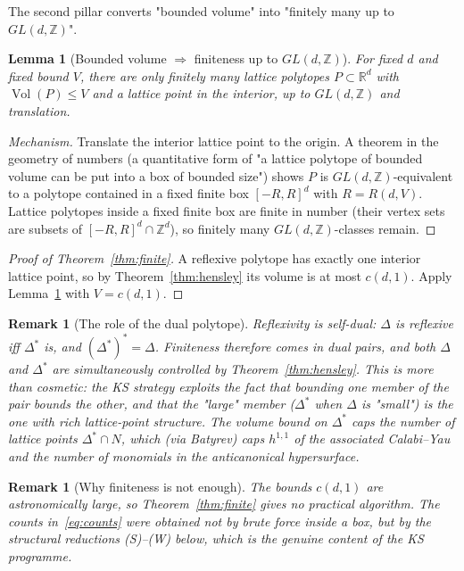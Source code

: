 \documentclass{amsart}
\newtheorem{lemma}[theorem]{Lemma}
\newtheorem{remark}[theorem]{Remark}
\begin{document}
The second pillar converts "bounded volume" into "finitely many up to
$GL(d,\mathbb{Z})$".

\begin{lemma}[Bounded volume $\Rightarrow$ finiteness up to $GL(d,\mathbb{Z})$]
\label{lem:boundedfinite}
For fixed $d$ and fixed bound $V$, there are only finitely many lattice
polytopes $P \subset \mathbb{R}^d$ with $\operatorname{Vol}(P) \leq V$ and a
lattice point in the interior, up to $GL(d,\mathbb{Z})$ and translation.
\end{lemma}

\begin{proof}[Mechanism]
Translate the interior lattice point to the origin. A theorem in the
geometry of numbers (a quantitative form of "a lattice polytope of bounded
volume can be put into a box of bounded size") shows $P$ is
$GL(d,\mathbb{Z})$-equivalent to a polytope contained in a fixed finite box
$[-R,R]^d$ with $R=R(d,V)$. Lattice polytopes inside a fixed finite box are
finite in number (their vertex sets are subsets of $[-R,R]^d \cap
\mathbb{Z}^d$), so finitely many $GL(d,\mathbb{Z})$-classes remain.
\end{proof}

\begin{proof}[Proof of Theorem~\ref{thm:finite}]
A reflexive polytope has exactly one interior lattice point, so by
Theorem~\ref{thm:hensley} its volume is at most $c(d,1)$. Apply
Lemma~\ref{lem:boundedfinite} with $V=c(d,1)$.
\end{proof}

\begin{remark}[The role of the dual polytope]
Reflexivity is self-dual: $\Delta$ is reflexive iff $\Delta^*$ is, and
$(\Delta^*)^* = \Delta$. Finiteness therefore comes in dual pairs, and
\emph{both} $\Delta$ and $\Delta^*$ are simultaneously controlled by
Theorem~\ref{thm:hensley}. This is more than cosmetic: the KS strategy
exploits the fact that bounding one member of the pair bounds the other,
and that the "large" member ($\Delta^*$ when $\Delta$ is "small") is the one
with rich lattice-point structure. The volume bound on $\Delta^*$ caps the
number of lattice points $\Delta^* \cap N$, which (via Batyrev) caps
$h^{1,1}$ of the associated Calabi--Yau and the number of monomials in the
anticanonical hypersurface.
\end{remark}

\begin{remark}[Why finiteness is not enough]
The bounds $c(d,1)$ are astronomically large, so Theorem~\ref{thm:finite}
gives no practical algorithm. The counts in~\eqref{eq:counts} were obtained
not by brute force inside a box, but by the structural reductions
(S)--(W) below, which is the genuine content of the KS programme.
\end{remark}
\end{document}
